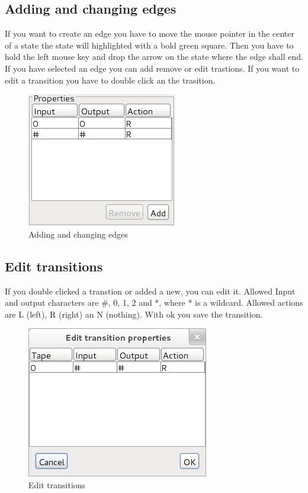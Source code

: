 \documentclass[%
  a4paper,%
  11pt,%
  blue,%
  hyperref	%
  ]{tubsartcl}
\begin{document}
\subsection{Adding and changing edges}
\label{sec:adding-chang-edges}
If you want to create an edge you have to move the mouse pointer in the center of a state the state will highlighted with a bold green square. Then you have to hold the left mouse key and drop the arrow on the state where the edge shall end. \\
If you have selected an edge you can add remove or edit trastions. If you want to edit a transition you have to double click an the trasition.
\begin{figure}[!htb]
\begin{center}
\includegraphics[scale=0.5]{graphics_gui/edge_properties.png}
\end{center}
\caption{Adding and changing edges}
\label{pic:edge_properties}
\end{figure}

\newpage

\subsection{Edit transitions}
\label{sec:edit-transitions}
If you double clicked a transtion or added a new, you can edit it. Allowed Input and output characters are #, 0, 1, 2 and *, where * is a wildcard. Allowed actions are L (left), R (right) an N (nothing). With ok you save the transition.
\begin{figure}[!htb]
\begin{center}
\includegraphics[scale=0.5]{graphics_gui/edit_transitions.png}
\end{center}
\caption{Edit transitions}
\label{pic:edit_transitions}
\end{figure}
\end{document}
